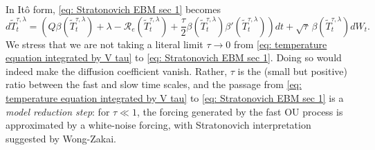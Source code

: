 \documentclass[10pt]{amsart}
\numberwithin{equation}{section}
\begin{document}
In It\^{o} form, \eqref{eq: Stratonovich EBM sec 1} becomes 
\begin{equation}
d\widetilde{T}_t ^{\tau,\lambda}
= \left(Q\beta(\widetilde{T}_t ^{\tau,\lambda})+\lambda-\mathcal{R}_e(\widetilde T_t^{\tau,\lambda})
+\frac{\tau}{2}\beta(\widetilde{T}_t ^{\tau,\lambda})\beta'(\widetilde{T}_t ^{\tau,\lambda})\right)dt
+ \sqrt{\tau}\,\beta(\widetilde{T}_t ^{\tau,\lambda}) dW_t.
\label{eq: closed EBM ito}
\end{equation}
We stress that we are not taking a literal limit $\tau\to0$ from \eqref{eq: temperature equation integrated by V tau} to \eqref{eq: Stratonovich EBM sec 1}. Doing so would indeed make the diffusion coefficient vanish. Rather, $\tau$ is the (small but positive) ratio between the fast and slow time scales, and the passage from
\eqref{eq: temperature equation integrated by V tau} to \eqref{eq: Stratonovich EBM sec 1} is a
\emph{model reduction step}: for $\tau\ll1$, the forcing generated by the fast OU process is
approximated by a white-noise forcing, with Stratonovich interpretation suggested by Wong-Zakai.
\end{document}

